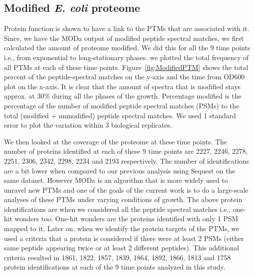 \documentclass[12pt]{article}
\begin{document}

\subsection{Modified \emph{E. coli} proteome}
Protein function is shown to have a link to the PTMs that are associated with it. Since, we have the MODa output of modified peptide spectral matches, we first calculated the amount of proteome modified. We did this for all the 9 time points i.e., from exponential to long-stationary phases. we plotted the total frequency of all PTMs at each of these time points. Figure~\ref{fig:ModifiedPTM} shows the total percent of the peptide-spectral matches on the y-axis and the time from OD600 plot on the x-axis. It is clear that the amount of spectra that is modified stays approx. at 30\% during all the phases of the growth. Percentage modified is the percentage of the number of modified peptide spectral matches (PSMs) to the total (modified + unmodified) peptide spectral matches. We used 1 standard error to plot the variation within 3 biological replicates.

We then looked at the coverage of the proteome at these time points. The number of proteins identified at each of these 9 time points are 2227, 2246, 2278, 2251, 2306, 2342, 2298, 2234 and 2193 respectively. The number of identifications are a bit lower when compared to our previous analysis using Sequest \cite{Houseretal2015} on the same dataset. However MODa is an algorithm that is more widely used to unravel new PTMs and one of the goals of the current work is to do a large-scale analyses of these PTMs under varying conditions of growth. The above protein identifications are when we considered all the peptide spectral matches i.e., one-hit wonders too. One-hit wonders are the proteins identified with only 1 PSM mapped to it. Later on, when we identify the protein targets of the PTMs, we used a criteria that a protein is considered if there were at least 2 PSMs (either same peptide appearing twice or at least 2 different peptides). This additional criteria resulted in 1861, 1822, 1857, 1839, 1864, 1892, 1866, 1813 and 1758 protein identifications at each of the 9 time points analyzed in this study.
\end{document}
